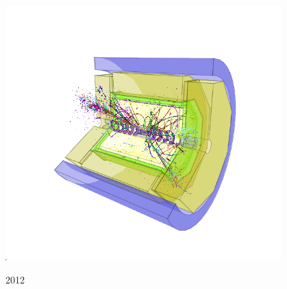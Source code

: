 \documentclass[a4paper,10pt]{article}
\begin{document}
\begin{titlepage}
\begin{center}
    \includegraphics[width=0.8\textwidth]{img/title.png}\\[1cm]    
    \vfill

    {\large 2012}
    
\end{center}
\end{titlepage}
\newpage


\tableofcontents
\newpage
\end{document}
